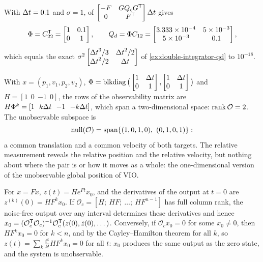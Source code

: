 \begin{solutions}
  \item With ${\Delta t} = 0.1$ and $\sigma = 1$,  of $\begin{bmatrix}-F & GQ_cG^{\mathsf{T}}\\ 0 & F^{\mathsf{T}}\end{bmatrix}{\Delta t}$ gives
        \[
          \Phi = C_{22}^{\mathsf{T}} = \begin{bmatrix}1 & 0.1\\0 & 1\end{bmatrix}, \qquad
          Q_d = \Phi C_{12} = \begin{bmatrix}3.333\times10^{-4} & 5\times10^{-3}\\ 5\times10^{-3} & 0.1\end{bmatrix},
        \]
        which equals the exact $\sigma^2\begin{bmatrix}{\Delta t}^3/3 & {\Delta t}^2/2\\ {\Delta t}^2/2 & {\Delta t}\end{bmatrix}$ of \cref{ex:double-integrator-qd} to $10^{-18}$.

  \item With $x = (p_1, v_1, p_2, v_2)$, $\Phi = \operatorname{blkdiag}\big(\begin{bmatrix}1 & {\Delta t}\\0 & 1\end{bmatrix}, \begin{bmatrix}1 & {\Delta t}\\0 & 1\end{bmatrix}\big)$ and $H = [1\ \ 0\ \ {-1}\ \ 0]$, the rows
        of the observability matrix are $H\Phi^k = [1\ \ k{\Delta t}\ \ {-1}\ \ {-k{\Delta t}}]$, which span a two-dimensional space: $\operatorname{rank}\mathcal O = 2$. The unobservable subspace
        is
        \[
          \operatorname{null}(\mathcal O) = \mathrm{span}\{(1, 0, 1, 0),\ (0, 1, 0, 1)\}:
        \]
        a common translation and a common velocity of both targets. The relative measurement reveals the relative position and the relative
        velocity, but nothing about where the pair is or how it moves as a whole: the one-dimensional version of the unobservable global position of
        VIO.

  \item For $\dot x = Fx$, $z(t) = He^{Ft}x_0$, and the derivatives of the output at $t = 0$ are $z^{(k)}(0) = HF^kx_0$. If $\mathcal O_c = [H;\ HF;\ \dots;\ HF^{n-1}]$ has
        full column rank, the noise-free output over any interval determines these derivatives and hence $x_0 = (\mathcal O_c^{\mathsf{T}}\mathcal O_c)^{-1}\mathcal O_c^{\mathsf{T}}
        (z(0), \dot z(0), \dots)$. Conversely, if $\mathcal O_cx_0 = 0$ for some $x_0 \ne 0$, then $HF^kx_0 = 0$ for $k < n$, and by the Cayley--Hamilton theorem for all
        $k$, so $z(t) = \sum_k\frac{t^k}{k!}HF^kx_0 = 0$ for all $t$: $x_0$ produces the same output as the zero state, and the system is unobservable.


\end{solutions}
